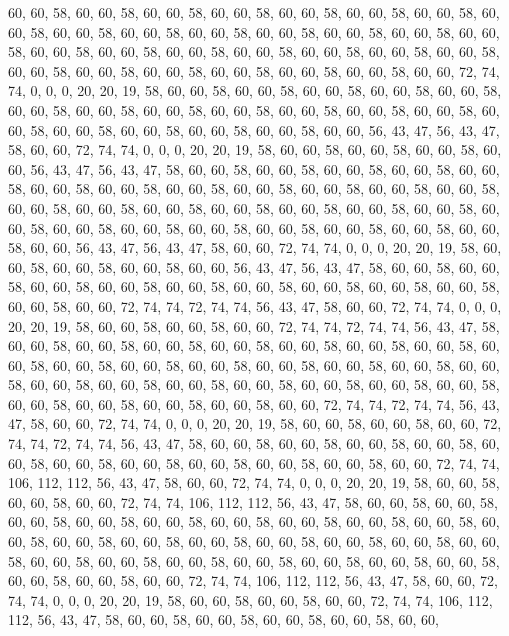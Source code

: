 60, 60, 58, 60, 60, 58, 60, 60, 58, 60, 60, 58, 60, 60, 58, 60, 60, 58, 60, 60, 58, 60, 60, 58, 60, 60, 58, 60, 60, 58, 60, 60, 58, 60, 60, 58, 60, 60, 58, 60, 60, 58, 60, 60, 58, 60, 60, 58, 60, 60, 58, 60, 60, 58, 60, 60, 58, 60, 60, 58, 60, 60, 58, 60,
60, 58, 60, 60, 58, 60, 60, 58, 60, 60, 58, 60, 60, 58, 60, 60, 58, 60, 60, 58, 60, 60, 72, 74, 74, 0, 0, 0, 20, 20, 19, 58, 60, 60, 58, 60, 60, 58, 60, 60, 58, 60, 60, 58, 60, 60, 58, 60, 60, 58, 60, 60, 58, 60, 60, 58, 60, 60, 58, 60, 60, 58, 60, 60,
58, 60, 60, 58, 60, 60, 58, 60, 60, 58, 60, 60, 58, 60, 60, 58, 60, 60, 58, 60, 60, 56, 43, 47, 56, 43, 47, 58, 60, 60, 72, 74, 74, 0, 0, 0, 20, 20, 19, 58, 60, 60, 58, 60, 60, 58, 60, 60, 58, 60, 60, 56, 43, 47, 56, 43, 47, 58, 60, 60, 58, 60, 60, 58,
60, 60, 58, 60, 60, 58, 60, 60, 58, 60, 60, 58, 60, 60, 58, 60, 60, 58, 60, 60, 58, 60, 60, 58, 60, 60, 58, 60, 60, 58, 60, 60, 58, 60, 60, 58, 60, 60, 58, 60, 60, 58, 60, 60, 58, 60, 60, 58, 60, 60, 58, 60, 60, 58, 60, 60, 58, 60, 60, 58, 60, 60, 58, 60,
60, 58, 60, 60, 58, 60, 60, 58, 60, 60, 58, 60, 60, 56, 43, 47, 56, 43, 47, 58, 60, 60, 72, 74, 74, 0, 0, 0, 20, 20, 19, 58, 60, 60, 58, 60, 60, 58, 60, 60, 58, 60, 60, 56, 43, 47, 56, 43, 47, 58, 60, 60, 58, 60, 60, 58, 60, 60, 58, 60, 60, 58, 60, 60,
58, 60, 60, 58, 60, 60, 58, 60, 60, 58, 60, 60, 58, 60, 60, 58, 60, 60, 72, 74, 74, 72, 74, 74, 56, 43, 47, 58, 60, 60, 72, 74, 74, 0, 0, 0, 20, 20, 19, 58, 60, 60, 58, 60, 60, 58, 60, 60, 72, 74, 74, 72, 74, 74, 56, 43, 47, 58, 60, 60, 58, 60, 60, 58,
60, 60, 58, 60, 60, 58, 60, 60, 58, 60, 60, 58, 60, 60, 58, 60, 60, 58, 60, 60, 58, 60, 60, 58, 60, 60, 58, 60, 60, 58, 60, 60, 58, 60, 60, 58, 60, 60, 58, 60, 60, 58, 60, 60, 58, 60, 60, 58, 60, 60, 58, 60, 60, 58, 60, 60, 58, 60, 60, 58, 60, 60, 58, 60,
60, 58, 60, 60, 58, 60, 60, 58, 60, 60, 72, 74, 74, 72, 74, 74, 56, 43, 47, 58, 60, 60, 72, 74, 74, 0, 0, 0, 20, 20, 19, 58, 60, 60, 58, 60, 60, 58, 60, 60, 72, 74, 74, 72, 74, 74, 56, 43, 47, 58, 60, 60, 58, 60, 60, 58, 60, 60, 58, 60, 60, 58, 60, 60,
58, 60, 60, 58, 60, 60, 58, 60, 60, 58, 60, 60, 58, 60, 60, 58, 60, 60, 72, 74, 74, 106, 112, 112, 56, 43, 47, 58, 60, 60, 72, 74, 74, 0, 0, 0, 20, 20, 19, 58, 60, 60, 58, 60, 60, 58, 60, 60, 72, 74, 74, 106, 112, 112, 56, 43, 47, 58, 60, 60, 58, 60, 60, 58,
60, 60, 58, 60, 60, 58, 60, 60, 58, 60, 60, 58, 60, 60, 58, 60, 60, 58, 60, 60, 58, 60, 60, 58, 60, 60, 58, 60, 60, 58, 60, 60, 58, 60, 60, 58, 60, 60, 58, 60, 60, 58, 60, 60, 58, 60, 60, 58, 60, 60, 58, 60, 60, 58, 60, 60, 58, 60, 60, 58, 60, 60, 58, 60,
60, 58, 60, 60, 58, 60, 60, 58, 60, 60, 72, 74, 74, 106, 112, 112, 56, 43, 47, 58, 60, 60, 72, 74, 74, 0, 0, 0, 20, 20, 19, 58, 60, 60, 58, 60, 60, 58, 60, 60, 72, 74, 74, 106, 112, 112, 56, 43, 47, 58, 60, 60, 58, 60, 60, 58, 60, 60, 58, 60, 60, 58, 60, 60,
